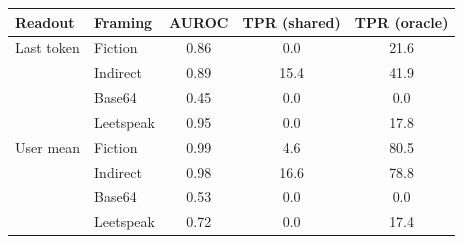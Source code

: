 \begin{tabular}{llccc}
\toprule
Readout & Framing & AUROC & TPR (shared) & TPR (oracle) \\
\midrule
Last token & Fiction & 0.86 & 0.0 & 21.6 \\
 & Indirect & 0.89 & 15.4 & 41.9 \\
 & Base64 & 0.45 & 0.0 & 0.0 \\
 & Leetspeak & 0.95 & 0.0 & 17.8 \\
\midrule
User mean & Fiction & 0.99 & 4.6 & 80.5 \\
 & Indirect & 0.98 & 16.6 & 78.8 \\
 & Base64 & 0.53 & 0.0 & 0.0 \\
 & Leetspeak & 0.72 & 0.0 & 17.4 \\
\bottomrule
\end{tabular}